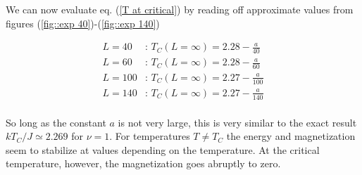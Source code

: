 \documentclass[11pt]{article}
\begin{document}
\begin{flushleft}
We can now evaluate eq. (\ref{T at critical}) by reading off approximate values from figures (\ref{fig::exp 40})-(\ref{fig::exp 140})

\begin{align*}
L=40 & \text{: }T_C(L = \infty ) = 2.28 - \frac{a}{40}\\
L=60 & \text{: }T_C(L = \infty ) = 2.28 - \frac{a}{60}\\
L=100 & \text{: }T_C(L = \infty ) = 2.27 - \frac{a}{100}\\
L=140 & \text{: }T_C(L = \infty ) = 2.27 - \frac{a}{140}\\
\end{align*}

So long as the constant $a$ is not very large, this is very similar to the exact result $kT_C/J \simeq 2.269$ for $\nu =1$. For temperatures $T \neq T_C$ the energy and magnetization seem to stabilize at values depending on the temperature. At the critical temperature, however, the magnetization goes abruptly to zero.
\end{flushleft}


\nocite{*}

{}

\end{document}
